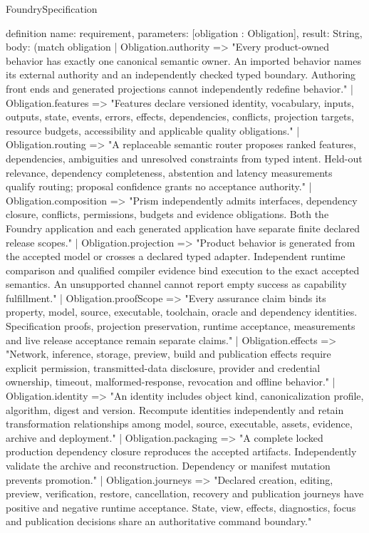 \begin{lexlean}{FoundrySpecification}
\begin{semanticmodule}
definition{
  name: requirement,
  parameters: [obligation : Obligation],
  result: String,
  body: (match obligation
    | Obligation.authority => "Every product-owned behavior has exactly one canonical semantic owner. An imported behavior names its external authority and an independently checked typed boundary. Authoring front ends and generated projections cannot independently redefine behavior."
    | Obligation.features => "Features declare versioned identity, vocabulary, inputs, outputs, state, events, errors, effects, dependencies, conflicts, projection targets, resource budgets, accessibility and applicable quality obligations."
    | Obligation.routing => "A replaceable semantic router proposes ranked features, dependencies, ambiguities and unresolved constraints from typed intent. Held-out relevance, dependency completeness, abstention and latency measurements qualify routing; proposal confidence grants no acceptance authority."
    | Obligation.composition => "Prism independently admits interfaces, dependency closure, conflicts, permissions, budgets and evidence obligations. Both the Foundry application and each generated application have separate finite declared release scopes."
    | Obligation.projection => "Product behavior is generated from the accepted model or crosses a declared typed adapter. Independent runtime comparison and qualified compiler evidence bind execution to the exact accepted semantics. An unsupported channel cannot report empty success as capability fulfillment."
    | Obligation.proofScope => "Every assurance claim binds its property, model, source, executable, toolchain, oracle and dependency identities. Specification proofs, projection preservation, runtime acceptance, measurements and live release acceptance remain separate claims."
    | Obligation.effects => "Network, inference, storage, preview, build and publication effects require explicit permission, transmitted-data disclosure, provider and credential ownership, timeout, malformed-response, revocation and offline behavior."
    | Obligation.identity => "An identity includes object kind, canonicalization profile, algorithm, digest and version. Recompute identities independently and retain transformation relationships among model, source, executable, assets, evidence, archive and deployment."
    | Obligation.packaging => "A complete locked production dependency closure reproduces the accepted artifacts. Independently validate the archive and reconstruction. Dependency or manifest mutation prevents promotion."
    | Obligation.journeys => "Declared creation, editing, preview, verification, restore, cancellation, recovery and publication journeys have positive and negative runtime acceptance. State, view, effects, diagnostics, focus and publication decisions share an authoritative command boundary."
}
\end{semanticmodule}
\end{lexlean}
